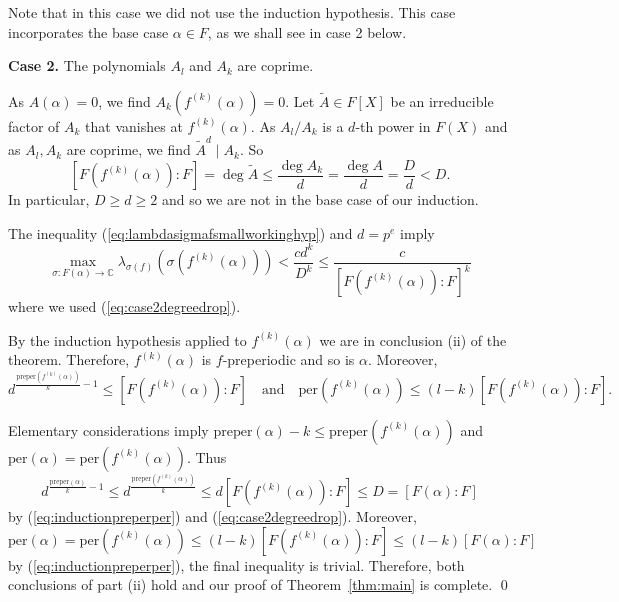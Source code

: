 \documentclass[12pt,oneside,a4]{amsart}
\newcommand{\IC}{\mathbb{C}}
\numberwithin{maincounter}{section}
\numberwithin{equation}{section}
\begin{document}
Note that in this case we did not use
the induction hypothesis. This case incorporates
the base case $\alpha\in F$, as we shall see in case 2 below.

\medskip
\noindent\textbf{Case 2.}
The polynomials $A_l$ and $A_k$ are coprime. 

As $A(\alpha)=0$, we find $A_k(f^{(k)}(\alpha))=0$. Let $\widetilde A\in F[X]$ be an
irreducible factor  of $A_k$ that vanishes at
$f^{(k)}(\alpha)$.
As $A_l/A_k$ is a $d$-th power in $F(X)$ and as $A_l,A_k$ are coprime, 
we find  $\widetilde A^d \mid A_k$. So 
\begin{equation}
  \label{eq:case2degreedrop}
  [F(f^{(k)}(\alpha)):F] = \deg \widetilde A \le \frac{\deg A_k}{d}
= \frac{\deg A}{d}=\frac{D}{d}< D. 
\end{equation}
In particular, $D\ge d\ge 2$ and so we are not in the base case of
our induction.

The inequality (\ref{eq:lambdasigmafsmallworkinghyp}) and $d=p^e$ imply
\begin{equation*}
  \max_{\sigma\colon F(\alpha)\rightarrow\IC}
  \lambda_{\sigma(f)}(\sigma(f^{(k)}(\alpha))) <
  \frac{c d^k}{D^{k}}             
  \le \frac{c}{[F(f^{(k)}(\alpha)):F]^{k}}  
\end{equation*}
where we used (\ref{eq:case2degreedrop}). 


By the induction hypothesis applied to $f^{(k)}(\alpha)$ we are in
conclusion (ii) of the theorem. Therefore, $f^{(k)}(\alpha)$ is
$f$-preperiodic and so is $\alpha$. Moreover, 
\begin{equation}
  \label{eq:inductionpreperper}
  d^{\frac{\mathrm{preper}(f^{(k)}(\alpha))}{k}-1} \le 
  [F(f^{(k)}(\alpha)):F] 
  \quad\text{and}\quad
  {\mathrm{per}(f^{(k)}(\alpha))} \le
  (l-k)[F(f^{(k)}(\alpha)):F]. 
\end{equation}

Elementary  considerations imply
$\mathrm{preper}(\alpha)-k\le \mathrm{preper}(f^{(k)}(\alpha))$
and $ \mathrm{per}(\alpha)=\mathrm{per}(f^{(k)}(\alpha))$. Thus
\begin{equation*}
  d^{\frac{\mathrm{preper}(\alpha)}{k}-1} \le
  d^{\frac{\mathrm{preper}(f^{(k)}(\alpha))}{k}} \le
  d[F(f^{(k)}(\alpha)):F] \le D=[F(\alpha):F]
\end{equation*}
by (\ref{eq:inductionpreperper}) and (\ref{eq:case2degreedrop}).
Moreover,
\begin{equation*}
  {\mathrm{per}(\alpha)}
  =  {\mathrm{per}(f^{(k)}(\alpha))}\le   
  (l-k)[F(f^{(k)}(\alpha)):F]\le   (l-k)[F(\alpha):F]
\end{equation*}
by (\ref{eq:inductionpreperper}), the final inequality is trivial.
Therefore, both conclusions of part (ii) hold and our proof of
Theorem~\ref{thm:main} is complete. \qed
\end{document}
